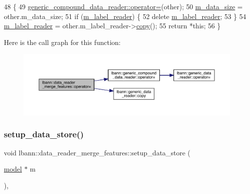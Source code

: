 \begin{DoxyCode}
48                                            \{
49   \hyperlink{classlbann_1_1generic__compound__data__reader_a7ece97b6fd2bc62da4d98f29cfb50155}{generic\_compound\_data\_reader::operator=}(other);
50   \hyperlink{classlbann_1_1data__reader__merge__features_ac9c56e08a45a5beac97e41e403fbaa12}{m\_data\_size} = other.m\_data\_size;
51   \textcolor{keywordflow}{if} (\hyperlink{classlbann_1_1data__reader__merge__features_a1e54a136c63b934f44ff91dc68ea3b27}{m\_label\_reader}) \{
52     \textcolor{keyword}{delete} \hyperlink{classlbann_1_1data__reader__merge__features_a1e54a136c63b934f44ff91dc68ea3b27}{m\_label\_reader};
53   \}
54   \hyperlink{classlbann_1_1data__reader__merge__features_a1e54a136c63b934f44ff91dc68ea3b27}{m\_label\_reader} = other.m\_label\_reader->\hyperlink{classlbann_1_1generic__data__reader_a208ba1223e7aaa75e94b728501f12f86}{copy}();
55   \textcolor{keywordflow}{return} *\textcolor{keyword}{this};
56 \}
\end{DoxyCode}
Here is the call graph for this function\+:\nopagebreak
\begin{figure}[H]
\begin{center}
\leavevmode
\includegraphics[width=350pt]{classlbann_1_1data__reader__merge__features_a2df9360e463c2ceaf4ba42e287f673b9_cgraph}
\end{center}
\end{figure}
\mbox{\label{classlbann_1_1data__reader__merge__features_a0ac1ade1b2abddfebe263b6f70a839cc}} 
\subsubsection{\texorpdfstring{setup\+\_\+data\+\_\+store()}{setup\_data\_store()}}
{\footnotesize\ttfamily void lbann\+::data\+\_\+reader\+\_\+merge\+\_\+features\+::setup\+\_\+data\+\_\+store (\begin{DoxyParamCaption}\item[{\hyperlink{classlbann_1_1model}{model} $\ast$}]{m }\end{DoxyParamCaption})\hspace{0.3cm}{\ttfamily [override]}, {\ttfamily [virtual]}}



